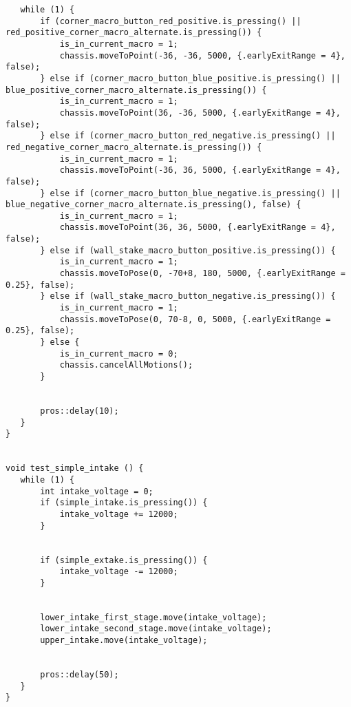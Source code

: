 \begin{verbatim}
   while (1) {
       if (corner_macro_button_red_positive.is_pressing() || red_positive_corner_macro_alternate.is_pressing()) {
           is_in_current_macro = 1;
           chassis.moveToPoint(-36, -36, 5000, {.earlyExitRange = 4}, false);
       } else if (corner_macro_button_blue_positive.is_pressing() || blue_positive_corner_macro_alternate.is_pressing()) {
           is_in_current_macro = 1;
           chassis.moveToPoint(36, -36, 5000, {.earlyExitRange = 4}, false);
       } else if (corner_macro_button_red_negative.is_pressing() || red_negative_corner_macro_alternate.is_pressing()) {
           is_in_current_macro = 1;
           chassis.moveToPoint(-36, 36, 5000, {.earlyExitRange = 4}, false);
       } else if (corner_macro_button_blue_negative.is_pressing() || blue_negative_corner_macro_alternate.is_pressing(), false) {
           is_in_current_macro = 1;
           chassis.moveToPoint(36, 36, 5000, {.earlyExitRange = 4}, false);
       } else if (wall_stake_macro_button_positive.is_pressing()) {
           is_in_current_macro = 1;
           chassis.moveToPose(0, -70+8, 180, 5000, {.earlyExitRange = 0.25}, false);
       } else if (wall_stake_macro_button_negative.is_pressing()) {
           is_in_current_macro = 1;
           chassis.moveToPose(0, 70-8, 0, 5000, {.earlyExitRange = 0.25}, false);
       } else {
           is_in_current_macro = 0;
           chassis.cancelAllMotions();
       }


       pros::delay(10);
   }
}


void test_simple_intake () {
   while (1) {
       int intake_voltage = 0;
       if (simple_intake.is_pressing()) {
           intake_voltage += 12000;
       }


       if (simple_extake.is_pressing()) {
           intake_voltage -= 12000;
       }


       lower_intake_first_stage.move(intake_voltage);
       lower_intake_second_stage.move(intake_voltage);
       upper_intake.move(intake_voltage);


       pros::delay(50);
   }
}


\end{verbatim}
